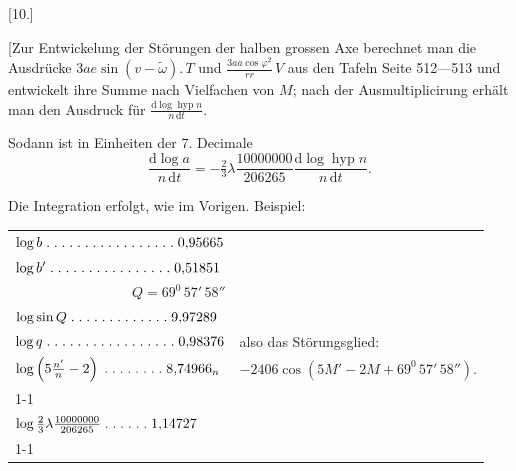 \clearpage
\begin{landscape}
\begingroup
\fontsize{10}{13}\selectfont
{}
\renewcommand{\headrulewidth}{0pt}
\begin{center}[10.]\end{center}
\par\noindent\hspace*{\parindent}[Zur Entwickelung der Störungen der halben grossen Axe berechnet man die Ausdrücke \(3ae\sin(v-\tilde\omega)\mathord{.}\,T\) und \(\frac{3aa\cos\varphi^2}{rr}\,V\) aus den Tafeln Seite 512—513 und entwickelt ihre Summe nach Vielfachen von \(M\); nach der Ausmultiplicirung erhält man den Ausdruck für \(\frac{\mathrm{d}\log\operatorname{hyp}n}{n\,\mathrm{d}t}\).
\par\noindent{}\hspace*{\parindent}Sodann ist in Einheiten der 7. Decimale
\[
\frac{\mathrm{d}\log a}{n\,\mathrm{d}t}=-\tfrac{2}{3}\lambda\frac{10000000}{206265}\frac{\mathrm{d}\log\operatorname{hyp}n}{n\,\mathrm{d}t}.
\]
\par\noindent\hspace*{\parindent}Die Integration erfolgt, wie im Vorigen. Beispiel:
\begingroup
\newcommand{\VTenPoint}{\mathord{.}\mkern5mu}
\newcommand{\VTenFive}{\VTenPoint\VTenPoint\VTenPoint\VTenPoint\VTenPoint}
\begin{center}
\begin{tabular}{@{}l@{\quad}l@{}}
\(\log b\;\VTenFive\VTenFive\VTenFive\VTenPoint\VTenPoint0{,}95665\)&\\
\(\log b'\;\VTenFive\VTenFive\VTenFive\VTenPoint0{,}51851\)&\\
\multicolumn{1}{r}{\(Q=69^0\,57'\,58''\)}&\\
\(\log\sin Q\;\VTenFive\VTenFive\VTenPoint\VTenPoint\VTenPoint9{,}97289\)&\\
\(\log q\;\VTenFive\VTenFive\VTenFive\VTenPoint\VTenPoint0{,}98376\)&also das Störungsglied:\\
\(\log\left(5\frac{n'}{n}-2\right)\;\VTenFive\VTenPoint\VTenPoint\VTenPoint8{,}74966_n\)&\(-2406\cos(5M'-2M+69^0\,57'\,58'').\)\\
\cline{1-1}
\multicolumn{1}{r}{\(2{,}23410\)}&\\[3pt]
\(\log\tfrac{2}{3}\lambda\frac{10000000}{206265}\;\VTenFive\VTenPoint1{,}14727\)&\\
\cline{1-1}
\multicolumn{1}{r}{\(3{,}38137_n\)}&
\end{tabular}

\end{center}
\end{landscape}
